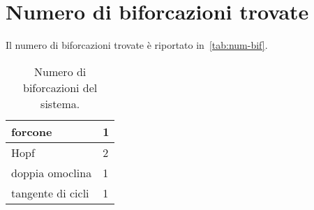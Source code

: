\section{Numero di biforcazioni trovate}
Il numero di biforcazioni trovate è riportato in~\autoref{tab:num-bif}.
\begin{table}[h]
    \centering
\begin{tabular}{| l | l |}
\hline
forcone & 1 \\
\hline
Hopf & 2 \\
\hline
doppia omoclina & 1 \\
\hline
tangente di cicli & 1 \\
\hline
\end{tabular}
\caption{Numero di biforcazioni del sistema.}
\label{tab:num-bif}
\end{table}

